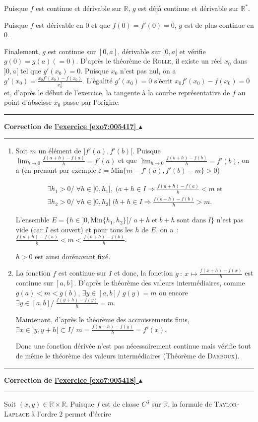 \documentclass[11pt,a4paper]{article}
\newcommand{\Rr}{\mathbb{R}} \newcommand{\R}{\mathbb{R}}
\newcounter{exo}
\newcommand{\correction}[1]{\hypertarget{cor7:#1}{}\label{cor7:#1}{\bf Correction de \hyperlink{exo7:#1}{l'exercice \ref{exo7:#1} $\blacktriangle$}}\vspace{1mm}\hrule\vspace{1mm}}
\newcommand{\fincorrection}{\vspace{1mm}\hrule\vspace*{7mm}}
\begin{document}
Puisque $f$ est continue et dérivable sur $\Rr$, $g$ est déjà continue et dérivable sur $\Rr^*$.

Puisque $f$ est dérivable en $0$ et que $f(0)=f'(0)=0$, $g$ est de plus continue en $0$.

Finalement, $g$ est continue sur $[0,a]$, dérivable sur $]0,a[$ et vérifie $g(0)=g(a)(= 0)$. D'après le théorème de \textsc{Rolle}, il existe un réel $x_0$ dans $]0,a[$ tel que $g'(x_0)=0$. Puisque $x_0$ n'est pas nul, on a $g'(x_0)=\frac{x_0f'(x_0)-f(x_0)}{x_0^2}$. L'égalité $g'(x_0)=0$ s'écrit $x_0f'(x_0)-f(x_0)=0$ et, d'après le début de l'exercice, la tangente à la courbe représentative de $f$ au point d'abscisse $x_0$ passe par l'origine.
\fincorrection
\correction{005417}
\begin{enumerate}
\item  Soit $m$ un élément de $]f'(a),f'(b)[$. Puisque $\lim_{h\rightarrow 0}\frac{f(a+h)-f(a)}{h}=f'(a)$ et que 
$\lim_{h\rightarrow 0}\frac{f(b+h)-f(b)}{h}=f'(b)$, on a (en prenant par exemple $\varepsilon=\mbox{Min}\{m-f'(a),f'(b)-m\}>0$) 

$$\begin{array}{l}
\exists h_1>0/\;\forall h\in]0,h_1[,\;(a+h\in I\Rightarrow\frac{f(a+h)-f(a)}{h}<m\;\mbox{et}\\
\exists h_2>0/\;\forall h\in]0,h_2[\;(b+h\in I\Rightarrow\frac{f(b+h)-f(b)}{h}> m.
\end{array}$$

L'ensemble $E=\{h\in]0,\mbox{Min}\{h_1,h_2\}[/\;a+h\;\mbox{et}\;b+h\;\mbox{sont dans}\;I\}$ n'est pas vide (car $I$ est ouvert) et pour tous les $h$ de $E$, on a~:$\frac{f(a+h)-f(a)}{h}<m<\frac{f(b+h)-f(b)}{h}$.

$h>0$ est ainsi dorénavant fixé.

\item  La fonction $f$ est continue sur $I$ et donc, la fonction $g~:~x\mapsto\frac{f(x+h)-f(x)}{h}$ est continue sur $[a,b]$. D'après le théorème des valeurs intermédiaires, comme $g(a)<m<g(b)$, $\exists y\in[a,b]/\;g(y)=m$ ou encore $\exists y\in[a,b]/\;\frac{f(y+h)-f(y)}{h}=m$.

Maintenant, d'après le théorème des accroissements finis, $\exists x\in]y,y+h[\subset I/\;m=\frac{f(y+h)-f(y)}{h}=f'(x)$.

Donc une fonction dérivée n'est pas nécessairement continue mais vérifie tout de même le théorème des valeurs intermédiaires (Théorème de \textsc{Darboux}).
\end{enumerate}
\fincorrection
\correction{005418}
Soit $(x,y)\in\Rr\times\Rr$. Puisque $f$ est de classe $C^3$ sur $\Rr$, la formule de \textsc{Taylor}-\textsc{Laplace} à l'ordre $2$ permet d'écrire
\end{document}
